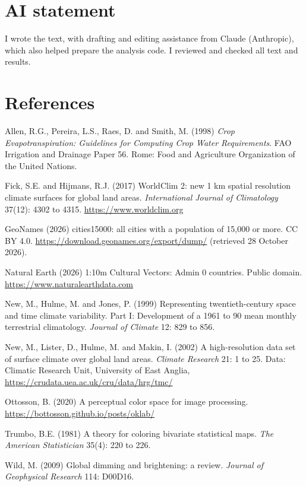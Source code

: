 \documentclass[11pt,a4paper]{article}
\begin{document}
\section*{AI statement}

I wrote the text, with drafting and editing assistance from Claude (Anthropic), which also helped prepare the analysis code. I reviewed and checked all text and results.

\section*{References}
\small
Allen, R.G., Pereira, L.S., Raes, D. and Smith, M. (1998) \emph{Crop Evapotranspiration: Guidelines for Computing Crop Water Requirements}. FAO Irrigation and Drainage Paper 56. Rome: Food and Agriculture Organization of the United Nations.

Fick, S.E. and Hijmans, R.J. (2017) WorldClim 2: new 1 km spatial resolution climate surfaces for global land areas. \emph{International Journal of Climatology} 37(12): 4302 to 4315. \url{https://www.worldclim.org}

GeoNames (2026) cities15000: all cities with a population of 15,000 or more. CC BY 4.0. \url{https://download.geonames.org/export/dump/} (retrieved 28 October 2026).

Natural Earth (2026) 1:10m Cultural Vectors: Admin 0 countries. Public domain. \url{https://www.naturalearthdata.com}

New, M., Hulme, M. and Jones, P. (1999) Representing twentieth-century space and time climate variability. Part I: Development of a 1961 to 90 mean monthly terrestrial climatology. \emph{Journal of Climate} 12: 829 to 856.

New, M., Lister, D., Hulme, M. and Makin, I. (2002) A high-resolution data set of surface climate over global land areas. \emph{Climate Research} 21: 1 to 25. Data: Climatic Research Unit, University of East Anglia, \url{https://crudata.uea.ac.uk/cru/data/hrg/tmc/}

Ottosson, B. (2020) A perceptual color space for image processing. \url{https://bottosson.github.io/posts/oklab/}

Trumbo, B.E. (1981) A theory for coloring bivariate statistical maps. \emph{The American Statistician} 35(4): 220 to 226.

Wild, M. (2009) Global dimming and brightening: a review. \emph{Journal of Geophysical Research} 114: D00D16.
\end{document}
